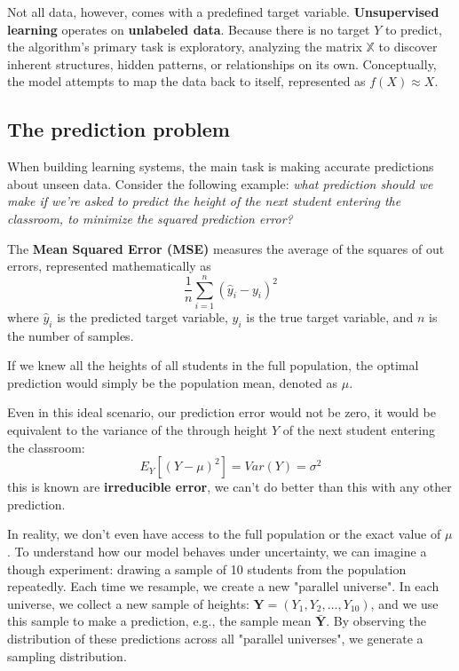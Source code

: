 Not all data, however, comes with a predefined target variable. \textbf{Unsupervised learning} operates on \textbf{unlabeled data}. Because there is no target $Y$ to predict, the algorithm's primary task is exploratory, analyzing the matrix $\mathbb X$ to discover inherent structures, hidden patterns, or relationships on its own. Conceptually, the model attempts to map the data back to itself, represented as $f(X) \approx X$.

\subsection{The prediction problem}

When building learning systems, the main task is making accurate predictions about unseen data. Consider the following example: \textit{what prediction should we make if we're asked to predict the height of the next student entering the classroom, to minimize the squared prediction error?}

The \textbf{Mean Squared Error (MSE)} measures the average of the squares of out errors, represented mathematically as
\begin{equation*}
	\frac 1 n \sum_{i = 1}^n \left( \hat y_i - y_i \right)^2
\end{equation*}
where $\hat y_i$ is the predicted target variable, $y_i$ is the true target variable, and $n$ is the number of samples.

If we knew all the heights of all students in the full population, the optimal prediction would simply be the population mean, denoted as $\mu$.

Even in this ideal scenario, our prediction error would not be zero, it would be equivalent to the variance of the through height $Y$ of the next student entering the classroom:
\begin{equation*}
	E_Y \left[ \left( Y - \mu \right)^2 \right]
	=
	Var(Y) = \sigma^2
\end{equation*}
this is known are \textbf{irreducible error}, we can't do better than this with any other prediction.

In reality, we don't even have access to the full population or the exact value of $\mu$. To understand how our model behaves under uncertainty, we can imagine a though experiment: drawing a sample of 10 students from the population repeatedly. Each time we resample, we create a new "parallel universe". In each universe, we collect a new sample of heights: $\bm{Y} = (Y_1, Y_2, \dots, Y_{10})$, and we use this sample to make a prediction, e.g., the sample mean $\bar{\bm{Y}}$. By observing the distribution of these predictions across all "parallel universes", we generate a sampling distribution.

